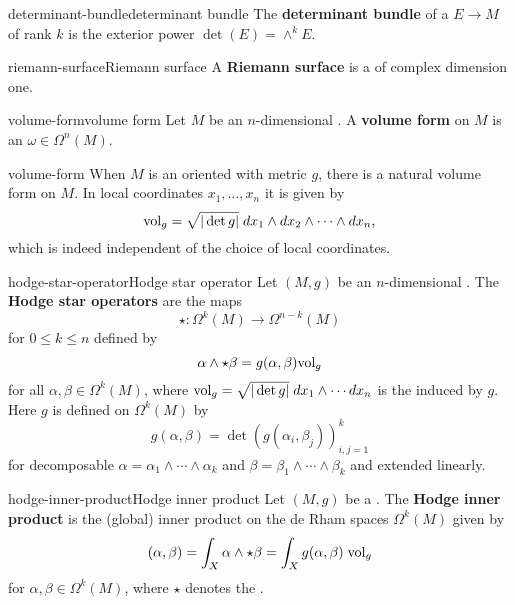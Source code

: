 \begin{topic}{determinant-bundle}{determinant bundle}
    The \textbf{determinant bundle} of a  $E \to M$ of rank $k$ is the exterior power $\det(E) = \wedge^k E$.
\end{topic}

\begin{topic}{riemann-surface}{Riemann surface}
    A \textbf{Riemann surface} is a   of complex dimension one.
\end{topic}

\begin{topic}{volume-form}{volume form}
    Let $M$ be an $n$-dimensional . A \textbf{volume form} on $M$ is an  $\omega \in \Omega^n(M)$.
\end{topic}

\begin{example}{volume-form}
    When $M$ is an oriented  with metric $g$, there is a natural volume form on $M$. In local coordinates $x_1, \ldots, x_n$ it is given by
    \[ \textup{vol}_g = \sqrt{|\det g|} \; dx_1 \wedge dx_2 \wedge \cdots \wedge dx_n , \]
    which is indeed independent of the choice of local coordinates.
\end{example}

\begin{topic}{hodge-star-operator}{Hodge star operator}
    Let $(M, g)$ be an $n$-dimensional . The \textbf{Hodge star operators} are the maps
    \[ \star : \Omega^k(M) \to \Omega^{n - k}(M) \]
    for $0 \le k \le n$ defined by
    \[ \alpha \wedge \star \beta = g(\alpha, \beta) \textup{vol}_g \]
    for all $\alpha, \beta \in \Omega^k(M)$, where $\textup{vol}_g = \sqrt{|\det g|} \; dx_1 \wedge \cdots dx_n$ is the  induced by $g$. Here $g$ is defined on $\Omega^k(M)$ by
    \[ g(\alpha, \beta) = \det\left(g(\alpha_i, \beta_j)\right)_{i, j = 1}^{k} \]
    for decomposable $\alpha = \alpha_1 \wedge \cdots \wedge \alpha_k$ and $\beta = \beta_1 \wedge \cdots \wedge \beta_k$ and extended linearly.
\end{topic}

\begin{topic}{hodge-inner-product}{Hodge inner product}
    Let $(M, g)$ be a . The \textbf{Hodge inner product} is the (global) inner product on the de Rham spaces $\Omega^k(M)$ given by
    \[ (\alpha, \beta) = \int_X \alpha \wedge \star \beta = \int_X g(\alpha, \beta) \; \textup{vol}_g \]
    for $\alpha, \beta \in \Omega^k(M)$, where $\star$ denotes the .
\end{topic}

